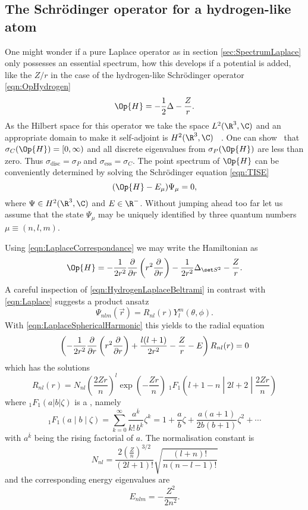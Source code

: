 \subsection{The Schrödinger operator for a hydrogen-like atom}
\label{sec:HydrogenAtom}
One might wonder if a pure Laplace operator as in section \vref{sec:SpectrumLaplace}
only possesses an essential spectrum,
how this develops if a potential is added,
like the $Z / r$ in the case of
the hydrogen-like Schrödinger operator \eqref{eqn:OpHydrogen}
\[
	\Op{H} = -\frac12 \Delta - \frac{Z}{r}.
\]
As the Hilbert space for this operator we take the \QM space $L^2(\R^3, \C)$
and an appropriate domain to make it self-adjoint is $H^2(\R^3, \C)$%
~\cite[p.~38]{Helffer2013}.
One can show~\cite{Davies2007,Teschl2014} that $\sigma_C(\Op{H}) = [0, \infty)$
and all discrete eigenvalues from $\sigma_P(\Op{H})$ are less than zero.
Thus $\sigma_\text{disc} = \sigma_P$ and $\sigma_\text{ess} = \sigma_C$.
The point spectrum of $\Op{H}$ can be conveniently
determined by solving the Schrödinger equation \eqref{eqn:TISE}
\begin{equation}
	( \Op{H} - E_{\mu} ) \Psi_\mu = 0,
	\label{eqn:HydrogenComplete}
\end{equation}
where $\Psi \in H^2(\R^3, \C)$ and $E \in \R^-$.
Without jumping ahead too far let us assume that the state
$\Psi_\mu$
may be uniquely identified by three quantum numbers $\mu \equiv (n, l, m)$.

\noindent
Using \eqref{eqn:LaplaceCorrespondance} we may write the Hamiltonian as
\begin{equation}
	\label{eqn:HydrogenLaplaceBeltrami}
	\Op{H} = -\frac{1}{2r^2} \laplaceRadial -\frac{1}{2r^2} \laplaceSphere - \frac{Z}{r}.
\end{equation}
A careful inspection of \eqref{eqn:HydrogenLaplaceBeltrami}
in contrast with \eqref{eqn:Laplace}
suggests a product ansatz
\[ \Psi_{nlm}(\vec{r}) = R_{nl}(r) Y_l^m(\theta, \phi). \]
%
With \eqref{eqn:LaplaceSphericalHarmonic} this yields to the radial equation
\begin{equation}
	\left( - \frac{1}{2r^2} \frac{\partial}{\partial r} \left( r^2 \frac{\partial}{\partial r} \right) + \frac{l (l+1)}{2 r^2} - \frac{Z}{r} - E \right) R_{nl}(r) = 0
	\label{eqn:HydrogenRadial}
\end{equation}
which has the solutions~\cite{Mueller2000}
\begin{equation}
	 R_{nl}(r) = N_{nl} \left(\frac{2Zr}{n}\right)^l \exp\left(-\frac{Zr}{n} \right)
\;_1F_1\left(l+1-n \middle| 2l+2 \middle|\frac{2Zr}{n}\right)
	\label{eqn:HydrogenRadialSolution}
\end{equation}
where $_1F_1\left(a|b|\zeta\right)$ is a ,
namely~\cite{Avery2006}
\[ _1F_1\left(a \middle| b \middle| \zeta\right) =
\sum_{k=0}^\infty \frac{a^{\bar{k}}}{k! \, b^{\bar{k}}} \zeta^k =
1 + \frac{a}{b} \zeta + \frac{a(a+1)}{2b(b+1)} \zeta^2 + \cdots \]
with $a^{\bar{k}}$ being the rising factorial of $a$.
The normalisation constant is
\[ N_{nl} = \frac{2 \left( \frac{Z}{n} \right)^{3/2}}{(2l+1)!} \sqrt{ \frac{(l+n)!}{n (n-l-1)!}} \]
and the corresponding energy eigenvalues are
\begin{equation}
	E_{nlm} = - \frac{Z^2}{2n^2}.
	\label{eqn:HydrogenEnergyLevels}
\end{equation}

